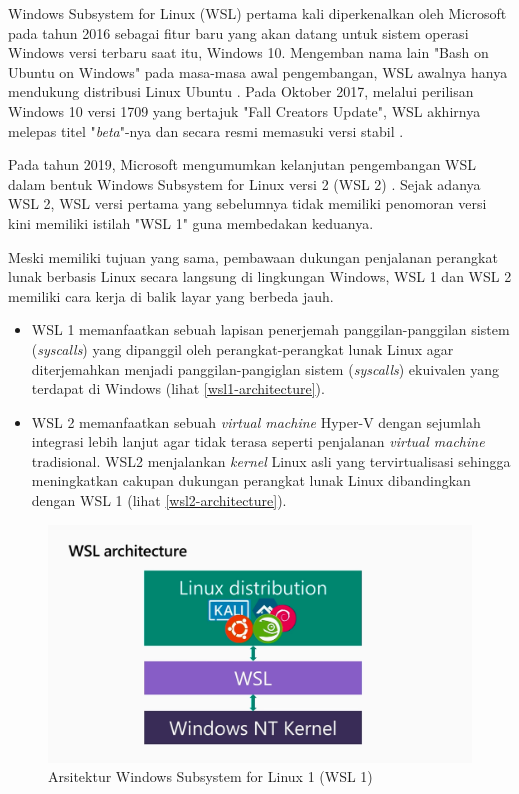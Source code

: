 Windows Subsystem for Linux (WSL) pertama kali diperkenalkan oleh Microsoft pada tahun 2016 sebagai fitur baru yang akan datang untuk sistem operasi Windows versi terbaru saat itu, Windows 10. Mengemban nama lain "Bash on Ubuntu on Windows" pada masa-masa awal pengembangan, WSL awalnya hanya mendukung distribusi Linux Ubuntu \cite{bouow-release-article}. Pada Oktober 2017, melalui perilisan Windows 10 versi 1709 yang bertajuk "Fall Creators Update", WSL akhirnya melepas titel "\textit{beta}"-nya dan secara resmi memasuki versi stabil \cite{omgubuntu-wsl-exits-beta}.

Pada tahun 2019, Microsoft mengumumkan kelanjutan pengembangan WSL dalam bentuk Windows Subsystem for Linux versi 2 (WSL 2) \cite{polarsparc-introduction-to-wsl2}. Sejak adanya WSL 2, WSL versi pertama yang sebelumnya tidak memiliki penomoran versi kini memiliki istilah "WSL 1" guna membedakan keduanya.

Meski memiliki tujuan yang sama, pembawaan dukungan penjalanan perangkat lunak berbasis Linux secara langsung di lingkungan Windows, WSL 1 dan WSL 2 memiliki cara kerja di balik layar yang berbeda jauh.
\begin{itemize}
    \item WSL 1 memanfaatkan sebuah lapisan penerjemah panggilan-panggilan sistem (\textit{syscalls}) yang dipanggil oleh perangkat-perangkat lunak Linux agar diterjemahkan menjadi panggilan-pangiglan sistem (\textit{syscalls}) ekuivalen yang terdapat di Windows (lihat \autoref{wsl1-architecture}).

    \item WSL 2 memanfaatkan sebuah \textit{virtual machine} Hyper-V dengan sejumlah integrasi lebih lanjut agar tidak terasa seperti penjalanan \textit{virtual machine} tradisional. WSL2 menjalankan \textit{kernel} Linux asli yang tervirtualisasi sehingga meningkatkan cakupan dukungan perangkat lunak Linux dibandingkan dengan WSL 1 (lihat \autoref{wsl2-architecture}).
\end{itemize}

\begin{figure}
    \centering
    \includegraphics[width=1\linewidth]{assets/wsl1-architecture-extracted-from-pendadaran-slides.png}
    \caption{Arsitektur Windows Subsystem for Linux 1 (WSL 1) \cite{youtube-new-wsl-architecture}}
    \label{wsl1-architecture}
\end{figure}

